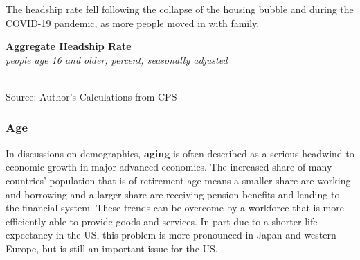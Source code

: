 \documentclass{report}
\makeatletter
\newcommand{\tbllink}[1]{\href{https://raw.githubusercontent.com/bdecon/US-chartbook/master/chartbook/data/#1}{\faTable}}
\newcommand*\short[1]{\expandafter\@gobbletwo\number\numexpr#1\relax}
\newcommand{\shdateaxisticks}{
		date coordinates in=x, axis line style={draw=none},
		xmax={2022-10-31},
		max space between ticks=40,	    
		xtick={{1990-01-01}, {1995-01-01}, {2000-01-01}, 
			{2005-01-01}, {2010-01-01}, {2015-01-01}, {2020-01-01}},
		minor xtick={},
		enlarge y limits={0.06}, enlarge x limits={0.01},
		}
\newcommand{\stdline}[4]{\addplot[very thick, no markers, color=#1] 
		table [x=#2, y=#3, col sep=comma] {#4};	}
\newcommand{\rebars}{
		\fill[color=black!10] (axis cs:{2007-12-01},\pgfkeysvalueof{/pgfplots/ymin}) rectangle 
			(axis cs:{2009-07-01}, \pgfkeysvalueof{/pgfplots/ymax});
		\fill[color=black!10] (axis cs:{2001-03-01},\pgfkeysvalueof{/pgfplots/ymin}) rectangle 
			(axis cs:{2001-11-01}, \pgfkeysvalueof{/pgfplots/ymax});
		\fill[color=black!10] (axis cs:{2020-02-01},\pgfkeysvalueof{/pgfplots/ymin}) rectangle 
			(axis cs:{2020-05-01}, \pgfkeysvalueof{/pgfplots/ymax});}
\makeatother
\begin{document}
{\begin{minipage}{0.25\textwidth}
\small The headship rate fell following the collapse of the housing bubble and during the COVID-19 pandemic, as more people moved in with family. 
\end{minipage}\hspace{6mm}
\begin{minipage}{0.47\textwidth}
\normalsize \textbf{Aggregate Headship Rate}\\
\footnotesize{\textit{people age 16 and older, percent, seasonally adjusted}}\\
\hspace*{-2mm} \\
\footnotesize{Source: Author's Calculations from CPS} \hfill \tbllink{headship.csv} 
\end{minipage}
\newpage
\begin{minipage}{0.76\textwidth}
\subsubsection*{Age}
\small In discussions on demographics, \textbf{aging} is often described as a serious headwind to economic growth in major advanced economies. The increased share of many countries' population that is of retirement age means a smaller share are working and borrowing and a larger share are receiving pension benefits and lending to the financial system. These trends can be overcome by a workforce that is more efficiently able to provide goods and services. In part due to a shorter life-expectancy in the US, this problem is more pronounced in Japan and western Europe, but is still an important issue for the US.


\end{minipage}}
\end{document}
